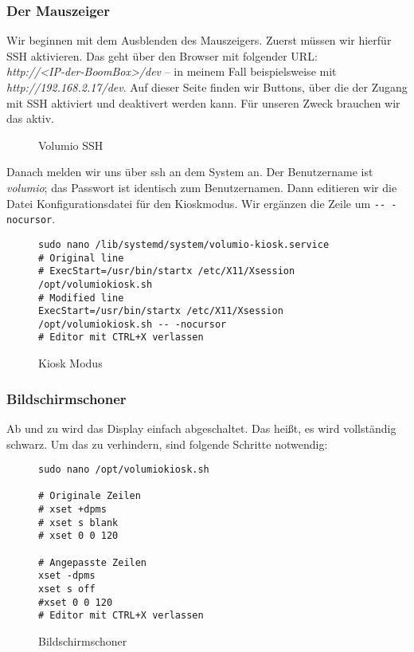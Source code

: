 \documentclass[12pt,a4paper]{article}
\newcommand{\capla}[1]{\caption{#1}\label{fig:#1}}
\newcommand{\code}[1]{\texttt{#1}}
\newcommand{\jpaimg}[2]{\begin{figure}[H]\centering\fbox{\texttt{[image: \#1]}}\capla{#2}\end{figure}}
\begin{document}
\subsubsection{Der Mauszeiger}\label{subsubsec:SSH}

Wir beginnen mit dem Ausblenden des Mauszeigers. Zuerst müssen wir hierfür SSH
aktivieren. Das geht über den Browser mit folgender URL:\@ \\
\textit{http://<IP-der-BoomBox>/dev} -- in meinem Fall beispielsweise mit \\
\textit{http://192.168.2.17/dev}. Auf dieser Seite finden wir Buttons, über die
der Zugang mit SSH aktiviert und deaktivert werden kann. Für unseren Zweck
brauchen wir das aktiv.

\jpaimg{./../images/vol-dev.png}{Volumio SSH}

Danach melden wir uns über ssh an dem System an. Der Benutzername ist
\textit{volumio}; das Passwort ist identisch zum Benutzernamen. Dann editieren
wir die Datei Konfigurationsdatei für den Kioskmodus. Wir ergänzen die Zeile
um \code{-{}- -nocursor}.

\begin{figure}[H]
\begin{lstlisting}
sudo nano /lib/systemd/system/volumio-kiosk.service
# Original line
# ExecStart=/usr/bin/startx /etc/X11/Xsession /opt/volumiokiosk.sh
# Modified line
ExecStart=/usr/bin/startx /etc/X11/Xsession /opt/volumiokiosk.sh -- -nocursor
# Editor mit CTRL+X verlassen
\end{lstlisting}
\capla{Kiosk Modus}
\end{figure}

\subsubsection{Bildschirmschoner}

Ab und zu wird das Display einfach abgeschaltet. Das heißt, es wird vollständig
schwarz. Um das zu verhindern, sind folgende Schritte notwendig:

\begin{figure}[H]
\begin{lstlisting}
sudo nano /opt/volumiokiosk.sh

# Originale Zeilen
# xset +dpms
# xset s blank
# xset 0 0 120

# Angepasste Zeilen
xset -dpms
xset s off
#xset 0 0 120
# Editor mit CTRL+X verlassen
\end{lstlisting}
\capla{Bildschirmschoner}
\end{figure}
\end{document}
